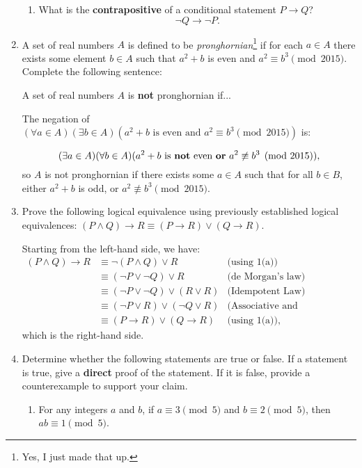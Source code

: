 \documentclass[12pt]{article}
\newcommand{\points}[1]{\marginpar{\hspace{24pt}[#1]}}
\begin{document}
\begin{enumerate}
\begin{enumerate}
\item What is the {\bf contrapositive} of a conditional statement $P\to Q$? \points{2}
\[
 \neg Q\to \neg P.
\]


\end{enumerate}
\newpage

\item A set of real numbers $A$ is defined to be {\em pronghornian}\footnote{Yes, I just made that up.} if for each $a\in A$ there exists some element $b\in A$ such that $a^2+b$ is even and $a^2\equiv b^3 \pmod{2015}$. Complete the following sentence:\points{3}

\medskip

A set of real numbers $A$ is {\bf not} pronghornian if...

\medskip

The negation of $(\forall a\in A)(\exists b\in A)(a^2+b \text{ is even and } a^2\equiv b^3\pmod{2015})$ is:

\[
 (\exists a\in A)(\forall b\in A)(a^2+b \text{ is {\bf not} even {\bf or} } a^2\not\equiv b^3\pmod{2015}),
\]
so $A$ is not pronghornian if there exists some $a\in A$ such that for all $b\in B$, either $a^2+b$ is odd, or $a^2\not\equiv b^3\pmod{2015}$.

\vspace{2in}



\item Prove the following logical equivalence using previously established logical equivalences: $(P\wedge Q)\to R\equiv (P\to R)\vee (Q\to R)$. \points{5}

\medskip

Starting from the left-hand side, we have:
\begin{align*}
 (P\wedge Q)\to R & \equiv \neg (P\wedge Q)\vee R &\text{(using 1(a))}\\
 & \equiv (\neg P\vee \neg Q)\vee R &\text{(de Morgan's law)}\\
 & \equiv (\neg P\vee \neg Q)\vee (R\vee R) &\text{(Idempotent Law)}\\
 & \equiv (\neg P\vee R)\vee (\neg Q\vee R)&\text{(Associative and Commutative Laws)}\\
 & \equiv (P\to R)\vee (Q\to R) &\text{(using 1(a))},
\end{align*}
which is the right-hand side.

\newpage

\item Determine whether the following statements are true or false. If a statement is true, give a {\bf direct} proof of the statement. If it is false, provide a counterexample to support your claim.
\begin{enumerate}
\item For any integers $a$ and $b$, if $a\equiv 3\pmod{5}$ and $b\equiv 2\pmod{5}$, then $ab\equiv 1\pmod{5}$. \points{4}


\end{enumerate}
\end{enumerate}
\end{document}
